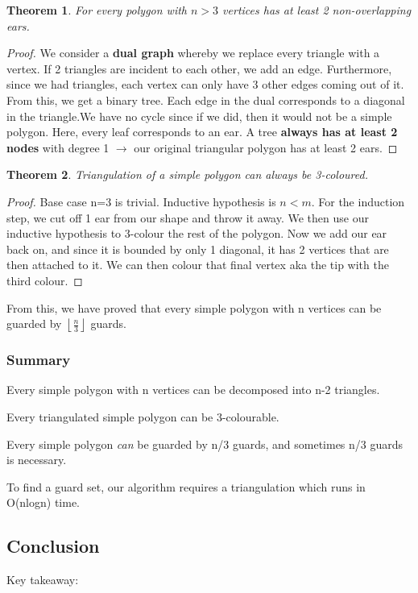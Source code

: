 \documentclass[11pt, oneside]{article}
\newtheorem{theorem}{Theorem}
\theoremstyle{definition}
\begin{document}
\begin{theorem}
  For every polygon with $n>3$ vertices has at least 2 non-overlapping ears.
\end{theorem}
\begin{proof}
  We consider a \textbf{dual graph} whereby we replace every triangle with a vertex. If 2 triangles are incident to each other, we add an edge. Furthermore, since we had triangles, each vertex can only have 3 other edges coming out of it. From this, we get a binary tree. Each edge in the dual corresponds to a diagonal in the triangle.We have no cycle since if we did, then it would not be a simple polygon. Here, every leaf corresponds to an ear. A tree \textbf{always has at least 2 nodes} with degree 1 $\rightarrow$ our original triangular polygon has at least 2 ears.
\end{proof}

\begin{theorem}
  Triangulation of a simple polygon can always be 3-coloured.
\end{theorem}
\begin{proof}
  Base case n=3 is trivial. Inductive hypothesis is $n<m$. For the induction step, we cut off 1 ear from our shape and throw it away. We then use our inductive hypothesis to 3-colour the rest of the polygon. Now we add our ear back on, and since it is bounded by only 1 diagonal, it has 2 vertices that are then attached to it. We can then colour that final vertex aka the tip with the third colour.
\end{proof}

From this, we have proved that every simple polygon with n vertices can be guarded by $\left \lfloor{\frac{n}{3}} \right \rfloor$ guards.

\subsubsection{Summary}
Every simple polygon with n vertices can be decomposed into n-2 triangles.

Every triangulated simple polygon can be 3-colourable.

Every simple polygon \textit{can} be guarded by n/3 guards, and sometimes n/3 guards is necessary.

To find a guard set, our algorithm requires a triangulation which runs in O(nlogn) time.


\subsection{Conclusion}
Key takeaway:
\end{document}
